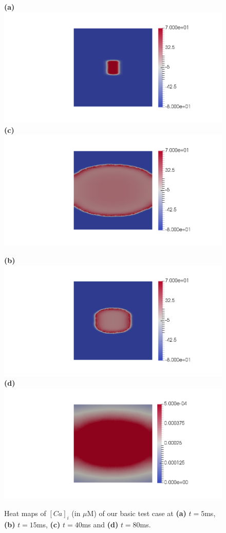 \documentclass[12pt,a4paper]{article}
\begin{document}
\begin{figure}

\begin{minipage}{0.47\textwidth}
 \textbf{(a)} \includegraphics[trim=9cm 0cm 2cm 0cm, clip=true, width=0.9\linewidth]{v5}
      \textbf{(c)} \includegraphics[trim=9cm 0cm 2cm 0cm, clip=true, width=0.9\linewidth]{v40}
    \end{minipage}
    \begin{minipage}{0.47\textwidth}
  \textbf{(b)} \includegraphics[trim=9cm 0cm 2cm 0cm, clip=true, width=0.9\linewidth]{v15}
  \textbf{(d)} \includegraphics[trim=9cm 0cm 2cm 0cm, clip=true, width=0.9\linewidth]{Casl80}
    \end{minipage}
    \caption{Heat maps of $[Ca]_i$ (in $\mu$M) of our basic test case at \textbf{(a)} $t=5$ms, \textbf{(b)} $t=15$ms, \textbf{(c)} $t=40$ms and \textbf{(d)} $t=80$ms.}
    \label{fig:2}
\end{figure}
\end{document}
